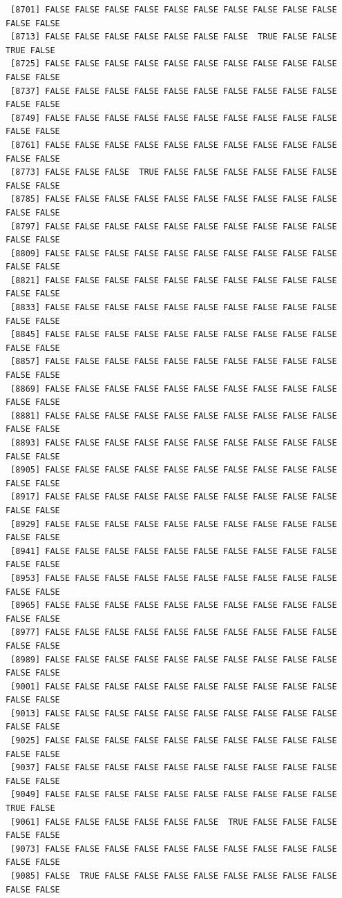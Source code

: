 \documentclass[
  a4paper,
  DIV=11,
  numbers=noendperiod]{scrartcl}
\begin{document}
\begin{verbatim}
 [8701] FALSE FALSE FALSE FALSE FALSE FALSE FALSE FALSE FALSE FALSE FALSE FALSE
 [8713] FALSE FALSE FALSE FALSE FALSE FALSE FALSE  TRUE FALSE FALSE  TRUE FALSE
 [8725] FALSE FALSE FALSE FALSE FALSE FALSE FALSE FALSE FALSE FALSE FALSE FALSE
 [8737] FALSE FALSE FALSE FALSE FALSE FALSE FALSE FALSE FALSE FALSE FALSE FALSE
 [8749] FALSE FALSE FALSE FALSE FALSE FALSE FALSE FALSE FALSE FALSE FALSE FALSE
 [8761] FALSE FALSE FALSE FALSE FALSE FALSE FALSE FALSE FALSE FALSE FALSE FALSE
 [8773] FALSE FALSE FALSE  TRUE FALSE FALSE FALSE FALSE FALSE FALSE FALSE FALSE
 [8785] FALSE FALSE FALSE FALSE FALSE FALSE FALSE FALSE FALSE FALSE FALSE FALSE
 [8797] FALSE FALSE FALSE FALSE FALSE FALSE FALSE FALSE FALSE FALSE FALSE FALSE
 [8809] FALSE FALSE FALSE FALSE FALSE FALSE FALSE FALSE FALSE FALSE FALSE FALSE
 [8821] FALSE FALSE FALSE FALSE FALSE FALSE FALSE FALSE FALSE FALSE FALSE FALSE
 [8833] FALSE FALSE FALSE FALSE FALSE FALSE FALSE FALSE FALSE FALSE FALSE FALSE
 [8845] FALSE FALSE FALSE FALSE FALSE FALSE FALSE FALSE FALSE FALSE FALSE FALSE
 [8857] FALSE FALSE FALSE FALSE FALSE FALSE FALSE FALSE FALSE FALSE FALSE FALSE
 [8869] FALSE FALSE FALSE FALSE FALSE FALSE FALSE FALSE FALSE FALSE FALSE FALSE
 [8881] FALSE FALSE FALSE FALSE FALSE FALSE FALSE FALSE FALSE FALSE FALSE FALSE
 [8893] FALSE FALSE FALSE FALSE FALSE FALSE FALSE FALSE FALSE FALSE FALSE FALSE
 [8905] FALSE FALSE FALSE FALSE FALSE FALSE FALSE FALSE FALSE FALSE FALSE FALSE
 [8917] FALSE FALSE FALSE FALSE FALSE FALSE FALSE FALSE FALSE FALSE FALSE FALSE
 [8929] FALSE FALSE FALSE FALSE FALSE FALSE FALSE FALSE FALSE FALSE FALSE FALSE
 [8941] FALSE FALSE FALSE FALSE FALSE FALSE FALSE FALSE FALSE FALSE FALSE FALSE
 [8953] FALSE FALSE FALSE FALSE FALSE FALSE FALSE FALSE FALSE FALSE FALSE FALSE
 [8965] FALSE FALSE FALSE FALSE FALSE FALSE FALSE FALSE FALSE FALSE FALSE FALSE
 [8977] FALSE FALSE FALSE FALSE FALSE FALSE FALSE FALSE FALSE FALSE FALSE FALSE
 [8989] FALSE FALSE FALSE FALSE FALSE FALSE FALSE FALSE FALSE FALSE FALSE FALSE
 [9001] FALSE FALSE FALSE FALSE FALSE FALSE FALSE FALSE FALSE FALSE FALSE FALSE
 [9013] FALSE FALSE FALSE FALSE FALSE FALSE FALSE FALSE FALSE FALSE FALSE FALSE
 [9025] FALSE FALSE FALSE FALSE FALSE FALSE FALSE FALSE FALSE FALSE FALSE FALSE
 [9037] FALSE FALSE FALSE FALSE FALSE FALSE FALSE FALSE FALSE FALSE FALSE FALSE
 [9049] FALSE FALSE FALSE FALSE FALSE FALSE FALSE FALSE FALSE FALSE  TRUE FALSE
 [9061] FALSE FALSE FALSE FALSE FALSE FALSE  TRUE FALSE FALSE FALSE FALSE FALSE
 [9073] FALSE FALSE FALSE FALSE FALSE FALSE FALSE FALSE FALSE FALSE FALSE FALSE
 [9085] FALSE  TRUE FALSE FALSE FALSE FALSE FALSE FALSE FALSE FALSE FALSE FALSE

\end{verbatim}
\end{document}
